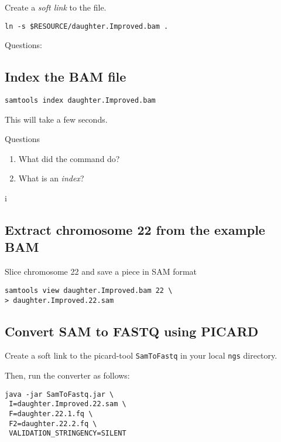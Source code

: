 \documentclass{article}
\begin{document}
Create a {\em soft link} to the file.

\begin{verbatim}
ln -s $RESOURCE/daughter.Improved.bam .
\end{verbatim}
Questions:
\subsection{Index the BAM file}
\begin{verbatim}
samtools index daughter.Improved.bam
\end{verbatim}
This will take a few seconds. 

Questions
\begin{enumerate}
\item  What did the command do? 
	\item What is an {\em index}?
\end{enumerate}i

\subsection{Extract chromosome 22 from the example BAM}
Slice chromosome 22 and save a piece in SAM format
\begin{verbatim}
samtools view daughter.Improved.bam 22 \
> daughter.Improved.22.sam
\end{verbatim}

\subsection{Convert SAM to FASTQ using PICARD}

Create a soft link to the picard-tool \verb+SamToFastq+ in your local \verb+ngs+ directory. 

Then, run the converter as follows:

\begin{verbatim}
java -jar SamToFastq.jar \
 I=daughter.Improved.22.sam \
 F=daughter.22.1.fq \
 F2=daughter.22.2.fq \
 VALIDATION_STRINGENCY=SILENT
\end{verbatim}
\end{document}
